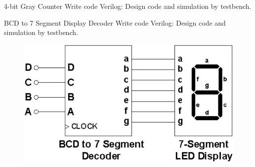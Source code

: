 \documentclass{vhdl-assignment}
\begin{document}
\begin{problem}{4-bit Gray Counter}
    Write code Verilog: Design code and simulation by testbench.


\end{problem}

\begin{problem}{BCD to 7 Segment Display Decoder}
    Write code Verilog: Design code and simulation by testbench.
    \begin{figure}[H]
        \centering
        \includegraphics{assets/GrayCounter.jpg}
    \end{figure}
\end{problem}
\end{document}
